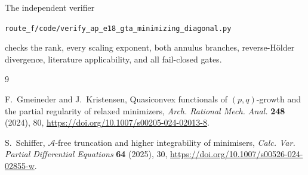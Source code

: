 \documentclass[10pt]{article}
\begin{document}
The independent verifier
\begin{center}
\texttt{route\_f/code/verify\_ap\_e18\_gta\_minimizing\_diagonal.py}
\end{center}
checks the rank, every scaling exponent, both annulus branches,
reverse-H\"older divergence, literature applicability, and all fail-closed
gates.

\begin{thebibliography}{9}

F.~Gmeineder and J.~Kristensen,
\newblock Quasiconvex functionals of \((p,q)\)-growth and the partial
regularity of relaxed minimizers,
\newblock \emph{Arch. Rational Mech. Anal.} \textbf{248} (2024), 80,
\newblock \url{https://doi.org/10.1007/s00205-024-02013-8}.

S.~Schiffer,
\newblock \(\mathscr A\)-free truncation and higher integrability of
minimisers,
\newblock \emph{Calc. Var. Partial Differential Equations} \textbf{64}
(2025), 30,
\newblock \url{https://doi.org/10.1007/s00526-024-02855-w}.

\end{thebibliography}
\end{document}
